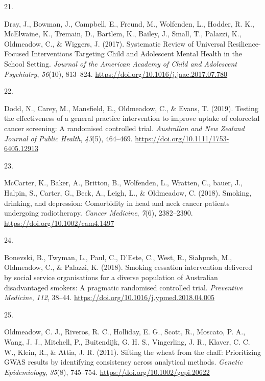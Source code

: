 \documentclass[11pt, a4paper]{awesome-cv}
\newlength{\csllabelwidth}
\newcommand{\CSLLeftMargin}[1]{\parbox[t]{\csllabelwidth}{#1}}
\newcommand{\CSLRightInline}[1]{\parbox[t]{\linewidth - \csllabelwidth}{#1}}
\begin{document}
\leavevmode\hypertarget{ref-dray_systematic_2017}{}%
\CSLLeftMargin{21. }
\CSLRightInline{Dray, J., Bowman, J., Campbell, E., Freund, M.,
Wolfenden, L., Hodder, R. K., McElwaine, K., Tremain, D., Bartlem, K.,
Bailey, J., Small, T., Palazzi, K., Oldmeadow, C., \& Wiggers, J.
(2017). Systematic Review of Universal Resilience-Focused Interventions
Targeting Child and Adolescent Mental Health in the School Setting.
\emph{Journal of the American Academy of Child and Adolescent
Psychiatry}, \emph{56}(10), 813--824.
\url{https://doi.org/10.1016/j.jaac.2017.07.780}}

\leavevmode\hypertarget{ref-dodd_testing_2019}{}%
\CSLLeftMargin{22. }
\CSLRightInline{Dodd, N., Carey, M., Mansfield, E., Oldmeadow, C., \&
Evans, T. (2019). Testing the effectiveness of a general practice
intervention to improve uptake of colorectal cancer screening: A
randomised controlled trial. \emph{Australian and New Zealand Journal of
Public Health}, \emph{43}(5), 464--469.
\url{https://doi.org/10.1111/1753-6405.12913}}

\leavevmode\hypertarget{ref-mccarter_smoking_2018}{}%
\CSLLeftMargin{23. }
\CSLRightInline{McCarter, K., Baker, A., Britton, B., Wolfenden, L.,
Wratten, C., bauer, J., Halpin, S., Carter, G., Beck, A., Leigh, L., \&
Oldmeadow, C. (2018). Smoking, drinking, and depression: Comorbidity in
head and neck cancer patients undergoing radiotherapy. \emph{Cancer
Medicine}, \emph{7}(6), 2382--2390.
\url{https://doi.org/10.1002/cam4.1497}}

\leavevmode\hypertarget{ref-bonevski_smoking_2018}{}%
\CSLLeftMargin{24. }
\CSLRightInline{Bonevski, B., Twyman, L., Paul, C., D'Este, C., West,
R., Siahpush, M., Oldmeadow, C., \& Palazzi, K. (2018). Smoking
cessation intervention delivered by social service organisations for a
diverse population of Australian disadvantaged smokers: A pragmatic
randomised controlled trial. \emph{Preventive Medicine}, \emph{112},
38--44. \url{https://doi.org/10.1016/j.ypmed.2018.04.005}}

\leavevmode\hypertarget{ref-oldmeadow_sifting_2011}{}%
\CSLLeftMargin{25. }
\CSLRightInline{Oldmeadow, C. J., Riveros, R. C., Holliday, E. G.,
Scott, R., Moscato, P. A., Wang, J. J., Mitchell, P., Buitendijk, G. H.
S., Vingerling, J. R., Klaver, C. C. W., Klein, R., \& Attia, J. R.
(2011). Sifting the wheat from the chaff: Prioritizing GWAS results by
identifying consistency across analytical methods. \emph{Genetic
Epidemiology}, \emph{35}(8), 745--754.
\url{https://doi.org/10.1002/gepi.20622}}
\end{document}
